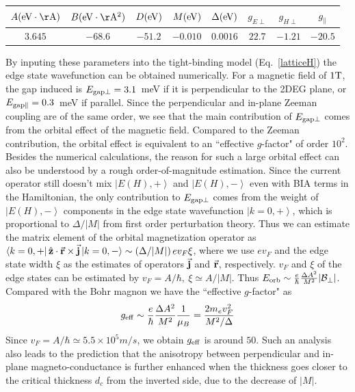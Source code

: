 \documentclass{article}
\begin{document}
\begin{center}
\begin{tabular}[h]{|c|c|c|c|c|c|c|c|}
\hline
$A({\rm eV\cdot \AA})$&$B({\rm eV\cdot \AA^2})$&$D({\rm eV})$&$M({\rm eV})$&$\Delta({\rm eV})$&$g_{E\perp}$&$g_{H\perp}$ &$g_{\parallel}$\\
\hline
$3.645$&$-68.6$&$-51.2$&$-0.010$&$0.0016$&$22.7$&$-1.21$&$-20.5$\\
\hline
\end{tabular}
\end{center}

By inputing these parameters into the tight-binding model
(Eq.~\ref{latticeH}) the edge state wavefunction can be obtained
numerically. For a magnetic field of $1{\rm T}$, the gap induced is
$E_{\rm gap\perp}=3.1$~meV if it is perpendicular to the 2DEG plane,
or $E_{\rm gap\parallel}=0.3$~meV if parallel. Since the
perpendicular and in-plane Zeeman coupling are of the same order, we
see that the main contribution of $E_{\rm gap\perp}$ comes from the
orbital effect of the magnetic field. Compared to the Zeeman
contribution, the orbital effect is equivalent to an ``effective
$g$-factor" of order $10^2$. Besides the numerical calculations, the
reason for such a large orbital effect can also be understood by a
rough order-of-magnitude estimation. Since the current operator
still doesn't mix $\left|E(H),+\right\rangle$ and
$\left|E(H),-\right\rangle$ even with BIA terms in the Hamiltonian,
the only contribution to $E_{\rm gap\perp}$ comes from the weight of
$\left|E(H),-\right\rangle$ components in the edge state
wavefunction $\left|k=0,+\right\rangle$, which is proportional to
$\Delta/|M|$ from first order perturbation theory. Thus we can
estimate the matrix element of the orbital magnetization operator as
$\left\langle k=0,+\right|\hat{\bf z}\cdot\vec{\bf r}\times\vec{\bf
j}\left|k=0,-\right\rangle\sim \left(\Delta/|M|\right)ev_F\xi$,
where we use $ev_F$ and the edge state width $\xi$ as the estimates
of operators $\vec{\bf j}$ and $\vec{\bf r}$, respectively. $v_F$
and $\xi$ of the edge states can be estimated by
$v_F=A/\hbar,~\xi\simeq A/|M|$. Thus $E_{\rm orb}\sim
\frac{e}{\hbar}\frac{\Delta A^2}{M^2}|\mathcal{B}_\perp|$. Compared
with the Bohr magnon we have the ``effective $g$-factor" as
\begin{eqnarray}
g_{\rm eff}\sim \frac{e}{\hbar}\frac{\Delta
A^2}{M^2}\frac1{\mu_B}=\frac{2m_ev_F^2}{M^2/\Delta}
\end{eqnarray}
Since $v_F=A/\hbar\simeq 5.5\times 10^5m/s$, we obtain $g_{\rm eff}$
is around $50$. Such an analysis also leads to the prediction that
the anisotropy between perpendicular and in-plane
magneto-conductance is further enhanced when the thickness goes
closer to the critical thickness $d_c$ from the inverted side, due
to the decrease of $|M|$.
\end{document}
